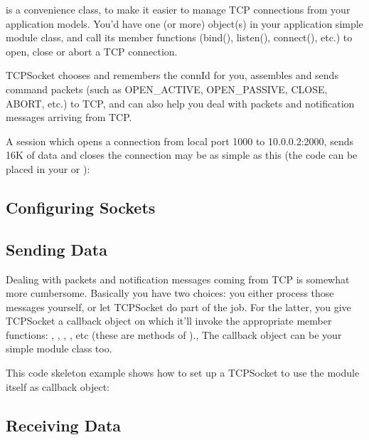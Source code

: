  is a convenience class, to make it easier to manage TCP connections
from your application models. You'd have one (or more)  object(s)
in your application simple module class, and call its member functions
(bind(), listen(), connect(), etc.) to open, close or abort a TCP connection.

TCPSocket chooses and remembers the connId for you, assembles and sends command
packets (such as OPEN\_ACTIVE, OPEN\_PASSIVE, CLOSE, ABORT, etc.) to TCP,
and can also help you deal with packets and notification messages arriving
from TCP.

A session which opens a connection from local port 1000 to 10.0.0.2:2000,
sends 16K of data and closes the connection may be as simple as this
(the code can be placed in your  or
):

\subsection*{Configuring Sockets}


\subsection*{Sending Data}


Dealing with packets and notification messages coming from TCP is somewhat
more cumbersome. Basically you have two choices: you either process those
messages yourself, or let TCPSocket do part of the job. For the latter,
you give TCPSocket a callback object on which it'll invoke the appropriate
member functions: , ,
, ,
etc (these are methods of ).,
The callback object can be your simple module class too.

This code skeleton example shows how to set up a TCPSocket to use the module
itself as callback object:

\subsection*{Receiving Data}


